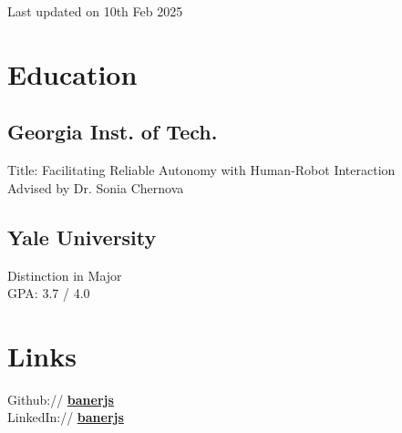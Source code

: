 \documentclass[]{deedy-resume}
\begin{document}
%
%
{\par\hfill{\scriptsize\color{gray}Last updated on 10th Feb 2025}}

%
%

%
%

\begin{minipage}[t]{0.33\textwidth}


\section{Education}

\subsection{Georgia Inst. of Tech.}
Title: Facilitating Reliable Autonomy with Human-Robot Interaction \\
Advised by Dr. Sonia Chernova
\sectionsep

\subsection{Yale University}
Distinction in Major \\
GPA: 3.7 / 4.0


\vspace{0.3cm}
\section{Links}
Github:// \href{https://github.com/banerjs}{\bf banerjs} \\
LinkedIn://  \href{https://www.linkedin.com/in/banerjs}{\bf banerjs} \\


\end{minipage}
\end{document}
